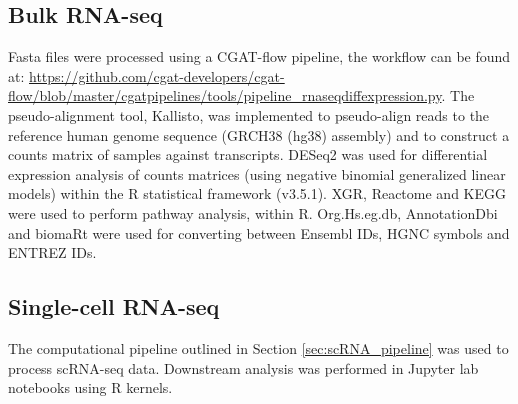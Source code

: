 \subsection{Bulk RNA-seq}\label{subsec:bulk_data_pro}
Fasta files were processed using a CGAT-flow\cite{sims2014cgat} pipeline, the workflow can be found at: \url{https://github.com/cgat-developers/cgat-flow/blob/master/cgatpipelines/tools/pipeline_rnaseqdiffexpression.py}.
The pseudo-alignment tool, Kallisto\cite{bray2016near}, was implemented to pseudo-align reads to the reference human genome sequence (GRCH38 (hg38) assembly) and to construct a counts matrix of samples against transcripts.
DESeq2\cite{love2014moderated} was used for differential expression analysis of  counts  matrices  (using  negative  binomial  generalized  linear  models) within the R statistical framework (v3.5.1).
XGR\cite{fang2016xgr}, Reactome\cite{fabregat2017reactome} and KEGG\cite{kanehisa2017kegg} were used to perform pathway analysis, within R\@.
Org.Hs.eg.db\cite{carlson2019org}, AnnotationDbi\cite{pages2020annotationdbi} and biomaRt\cite{durinck2009mapping} were used for converting between Ensembl IDs, HGNC symbols and ENTREZ IDs.

\subsection{Single-cell RNA-seq}
The computational pipeline outlined in Section \ref{sec:scRNA_pipeline} was used to process scRNA-seq data.
Downstream analysis was performed in Jupyter lab notebooks\cite{Kluyver2016jupyter} using R kernels.





